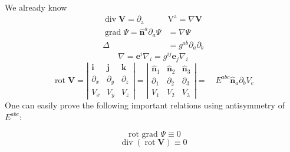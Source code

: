 We already know
$$
\begin{array}{rl}
{\operatorname{div} \mathbf{V}=\partial_{\mathrm{a}}} & {\mathrm{V}^{\mathrm{a}}=\nabla \mathbf{V}} \\
{\operatorname{grad} \Psi=\hat{\mathbf{n}}^{a} \partial_{a} \Psi} & {=\nabla \Psi} \\
{\Delta} & {=g^{a b} \partial_{a} \partial_{b}}
\end{array}
$$
$$
\nabla=\mathbf{e}^{i} \nabla_{i}=g^{i j} \mathbf{e}_{j} \nabla_{i}
$$
$$
\operatorname{rot} \mathbf{V}=\left|\begin{array}{ccc}
{\mathbf{i}} & {\mathbf{j}} & {\mathbf{k}} \\
{\partial_{x}} & {\partial_{y}} & {\partial_{z}} \\
{V_{x}} & {V_{y}} & {V_{z}}
\end{array}\right|=\left|\begin{array}{ccc}
{\hat{\mathbf{n}}_{1}} & {\hat{\mathbf{n}}_{2}} & {\hat{\mathbf{n}}_{3}} \\
{\partial_{1}} & {\partial_{2}} & {\partial_{3}} \\
{V_{1}} & {V_{2}} & {V_{3}}
\end{array}\right|=\quad E^{a b c} \hat{\mathbf{n}}_{a} \partial_{b} V_{c}
$$
One can easily prove the following important relations using antisymmetry of $E^{abc}$:
\begin{qt}
\begin{equation}
\text { rot grad } \Psi \equiv 0
\end{equation}
\begin{equation}
\operatorname{div}(\operatorname{rot} \mathbf{V}) \equiv 0
\end{equation}
\end{qt}

